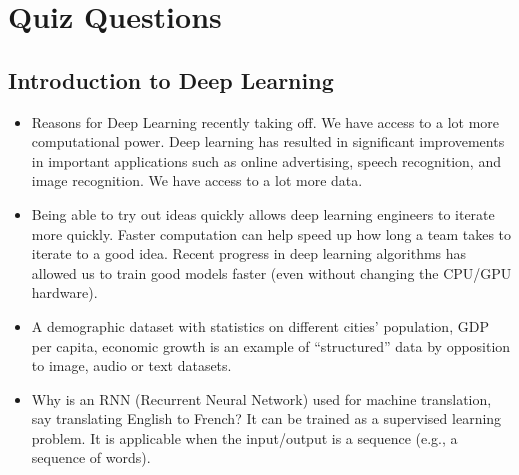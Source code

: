\section{Quiz Questions}

\subsection{Introduction to Deep Learning}
\begin{itemize}[wide, labelwidth=!, labelindent=0pt]
\itemsep0em 
    \item Reasons for Deep Learning recently taking off. We have access to a lot more computational power. Deep learning has resulted in significant improvements in important applications such as online advertising, speech recognition, and image recognition. We have access to a lot more data.
    \item Being able to try out ideas quickly allows deep learning engineers to iterate more quickly. Faster computation can help speed up how long a team takes to iterate to a good idea. Recent progress in deep learning algorithms has allowed us to train good models faster (even without changing the CPU/GPU hardware).
    \item A demographic dataset with statistics on different cities' population, GDP per capita, economic growth is an example of “structured” data by opposition to image, audio or text datasets.
    \item Why is an RNN (Recurrent Neural Network) used for machine translation, say translating English to French? It can be trained as a supervised learning problem. It is applicable when the input/output is a sequence (e.g., a sequence of words). 
\end{itemize}